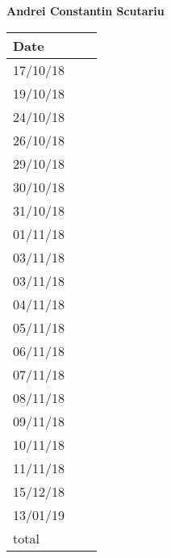 \documentclass[../main.tex]{subfiles}
\begin{document}
\begin{center}
	{\bf Andrei Constantin Scutariu}
	\vspace{2mm}

		\begin{tabular}{p{1.3cm}|p{1.8cm}|p{6.7cm}}
			\hline
			\bf Date & \bf \makebox[1.8cm][c]{Hours} & \bf \makebox[6.7cm][c]{Description} \\
			\hline
			17/10/18 & \makebox[1.8cm][c]{2h} & \makebox[6.7cm][c]{Introduction}\\
			19/10/18 & \makebox[1.8cm][c]{3h} & \makebox[6.7cm][c]{Goals, Requirements, Domain assumptions}\\
			24/10/18 & \makebox[1.8cm][c]{4h} & \makebox[6.7cm][c]{Goals, Requirements, Domain assumptions}\\
			26/10/18 & \makebox[1.8cm][c]{1h} & \makebox[6.7cm][c]{Purpose, Scope}\\
			29/10/18 & \makebox[1.8cm][c]{2h} & \makebox[6.7cm][c]{UML Class Diagrams}\\
			30/10/18 & \makebox[1.8cm][c]{1h} & \makebox[6.7cm][c]{Purpose, Scope}\\
			31/10/18 & \makebox[1.8cm][c]{3h} & \makebox[6.7cm][c]{UML Class Diagrams}\\
			01/11/18 & \makebox[1.8cm][c]{1h} & \makebox[6.7cm][c]{Use Cases \& Scenarios}\\
			03/11/18 & \makebox[1.8cm][c]{1h} & \makebox[6.7cm][c]{Mockups, Scenarios}\\
			03/11/18 & \makebox[1.8cm][c]{2h} & \makebox[6.7cm][c]{UML Class \& State Machine Diagrams}\\
			04/11/18 & \makebox[1.8cm][c]{3h} & \makebox[6.7cm][c]{Specific Requirements}\\
			05/11/18 & \makebox[1.8cm][c]{1h} & \makebox[6.7cm][c]{Goals, Requirements, Domain assumptions}\\
			06/11/18 & \makebox[1.8cm][c]{1h} & \makebox[6.7cm][c]{Mockups}\\
			07/11/18 & \makebox[1.8cm][c]{4h} & \makebox[6.7cm][c]{Alloy}\\
			08/11/18 & \makebox[1.8cm][c]{5h} & \makebox[6.7cm][c]{Alloy, Revisioning}\\
			09/11/18 & \makebox[1.8cm][c]{4h} & \makebox[6.7cm][c]{Alloy}\\
			10/11/18 & \makebox[1.8cm][c]{5h} & \makebox[6.7cm][c]{Alloy, Revisioning}\\
			11/11/18 & \makebox[1.8cm][c]{4h} & \makebox[6.7cm][c]{Revisioning}\\
			15/12/18 & \makebox[1.8cm][c]{1h} & \makebox[6.7cm][c]{Revisioning}\\
			13/01/19 & \makebox[1.8cm][c]{1h} & \makebox[6.7cm][c]{Revisioning}\\
			total    & \makebox[1.8cm][c]{49h}
		\end{tabular}
\end{center}
\vspace{1cm}
\end{document}
